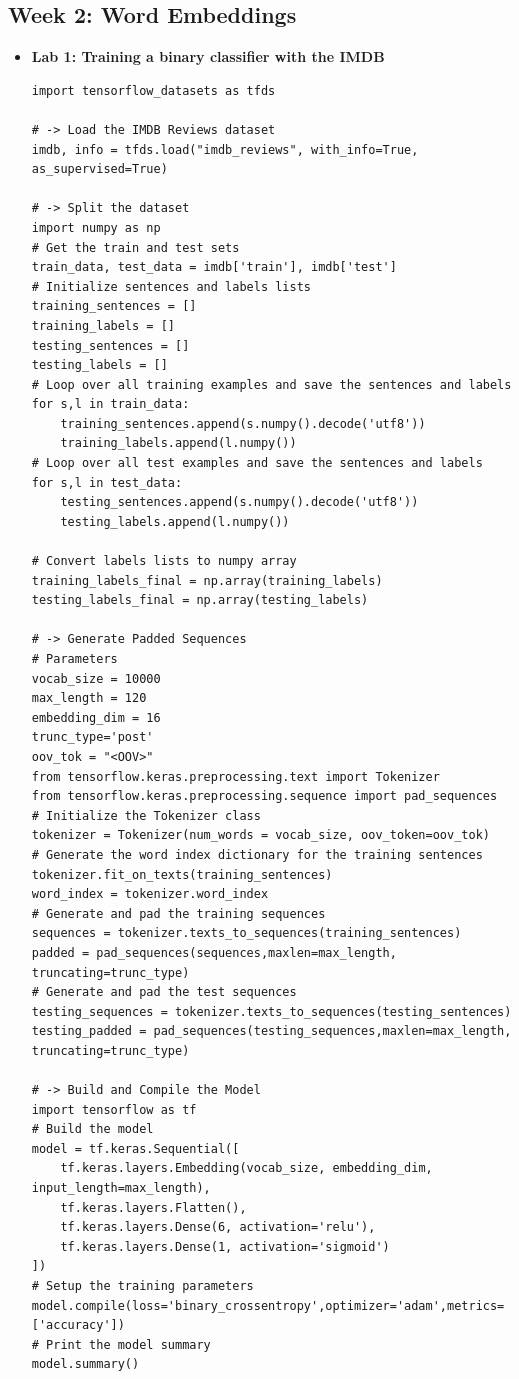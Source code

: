 \documentclass[20pt]{article}
\begin{document}
	\subsection{Week 2: Word Embeddings}
	\begin{itemize}
		\item \textbf{Lab 1: Training a binary classifier with the IMDB}\\
		\begin{verbatim}
import tensorflow_datasets as tfds

# -> Load the IMDB Reviews dataset
imdb, info = tfds.load("imdb_reviews", with_info=True, as_supervised=True)

# -> Split the dataset
import numpy as np
# Get the train and test sets
train_data, test_data = imdb['train'], imdb['test']
# Initialize sentences and labels lists
training_sentences = []
training_labels = []
testing_sentences = []
testing_labels = []
# Loop over all training examples and save the sentences and labels
for s,l in train_data:
	training_sentences.append(s.numpy().decode('utf8'))
	training_labels.append(l.numpy())
# Loop over all test examples and save the sentences and labels
for s,l in test_data:
	testing_sentences.append(s.numpy().decode('utf8'))
	testing_labels.append(l.numpy())

# Convert labels lists to numpy array
training_labels_final = np.array(training_labels)
testing_labels_final = np.array(testing_labels)

# -> Generate Padded Sequences
# Parameters
vocab_size = 10000
max_length = 120
embedding_dim = 16
trunc_type='post'
oov_tok = "<OOV>"
from tensorflow.keras.preprocessing.text import Tokenizer
from tensorflow.keras.preprocessing.sequence import pad_sequences
# Initialize the Tokenizer class
tokenizer = Tokenizer(num_words = vocab_size, oov_token=oov_tok)
# Generate the word index dictionary for the training sentences
tokenizer.fit_on_texts(training_sentences)
word_index = tokenizer.word_index
# Generate and pad the training sequences
sequences = tokenizer.texts_to_sequences(training_sentences)
padded = pad_sequences(sequences,maxlen=max_length, truncating=trunc_type)
# Generate and pad the test sequences
testing_sequences = tokenizer.texts_to_sequences(testing_sentences)
testing_padded = pad_sequences(testing_sequences,maxlen=max_length, truncating=trunc_type)

# -> Build and Compile the Model
import tensorflow as tf
# Build the model
model = tf.keras.Sequential([
	tf.keras.layers.Embedding(vocab_size, embedding_dim, input_length=max_length),
	tf.keras.layers.Flatten(),
	tf.keras.layers.Dense(6, activation='relu'),
	tf.keras.layers.Dense(1, activation='sigmoid')
])
# Setup the training parameters
model.compile(loss='binary_crossentropy',optimizer='adam',metrics=['accuracy'])
# Print the model summary
model.summary()


\end{verbatim}
\end{itemize}
\end{document}
